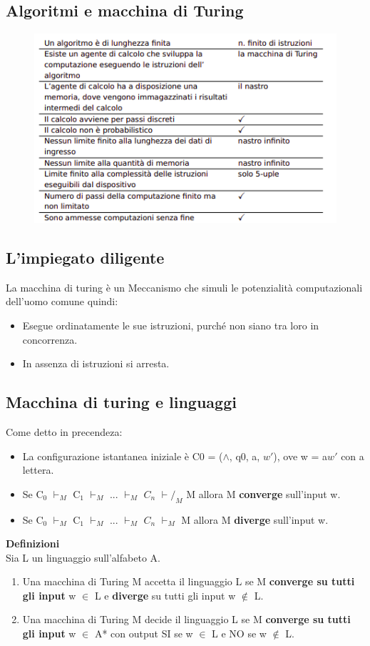 \subsection{Algoritmi e macchina di Turing}
\begin{figure}[htp]
    \centering
     \includegraphics[scale=1]{tesi_stile/img/algo-turing.png}
\end{figure}
\subsection{L'impiegato diligente}
La macchina di turing è un Meccanismo che simuli le potenzialità computazionali dell’uomo comune quindi: 
\begin{itemize}
    \item Esegue ordinatamente le sue istruzioni, purché non siano tra loro in concorrenza.
    
    \item In assenza di istruzioni si arresta.
\end{itemize}
\newpage
\subsection{Macchina di turing e linguaggi}
Come detto in precendeza:
\begin{itemize}
    \item La configurazione istantanea iniziale è C0 = ($\wedge$, q0, a, $w'$), ove w = a$w'$
    con a lettera.
    
    \item Se C$_0$ $\vdash_M$ C$_1$ $\vdash_M$ ... $\vdash_M$ $C_n$ $\vdash/_M$ M allora M \textbf{converge} sull’input w.
    
    \item Se C$_0$ $\vdash_M$ C$_1$ $\vdash_M$ ... $\vdash_M$ $C_n$ $\vdash_M$ M allora M \textbf{diverge} sull’input w.
\end{itemize}
\textbf{Definizioni}\\
Sia L un linguaggio sull’alfabeto A.
\begin{enumerate}
    \item Una macchina di Turing M accetta il linguaggio L se M \textbf{converge su tutti gli input} w $\in$ L e \textbf{diverge} su tutti gli input w $\not \in$ L.
    
    \item Una macchina di Turing M decide il linguaggio L se M \textbf{converge su tutti gli input} w $\in$ A* con output SI se w $\in$ L e NO se w $\not \in$ L.
\end{enumerate}
